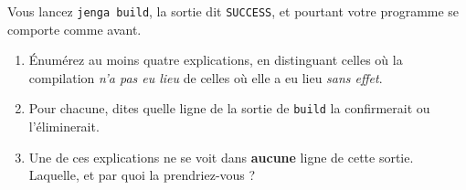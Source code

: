 \begin{nklogique}
Vous lancez \texttt{jenga build}, la sortie dit \texttt{SUCCESS}, et pourtant
votre programme se comporte comme avant.

\begin{enumerate}
\item Énumérez au moins quatre explications, en distinguant celles où la
      compilation \emph{n'a pas eu lieu} de celles où elle a eu lieu \emph{sans
      effet}.
\item Pour chacune, dites quelle ligne de la sortie de \texttt{build} la
      confirmerait ou l'éliminerait.
\item Une de ces explications ne se voit dans \textbf{aucune} ligne de cette
      sortie. Laquelle, et par quoi la prendriez-vous ?
\end{enumerate}
\end{nklogique}
